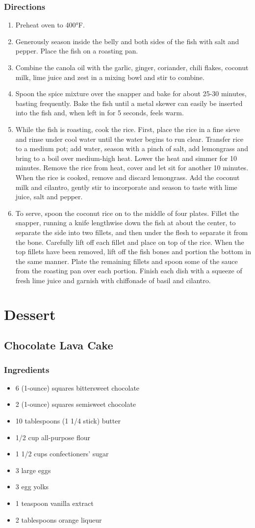 \documentclass[oneside,11pt]{book}
\newcommand{\Ingredients}[1]{
    \subsection*{Ingredients}
    \begin{itemize} 
      #1 
    \end{itemize}
}
\newcommand{\Directions}[1]{
    \subsection*{Directions}
    \begin{enumerate} 
      #1 
    \end{enumerate}
}
\newcommand{\recipe}[1]{
    \section*{ \hspace{-12pt} #1 }
    \addcontentsline{toc}{section}{ \hspace{-6pt} #1 }
}
\begin{document}
        \Directions{
            \item Preheat oven to 400°F.
            \item Generously season inside the belly and both sides of the fish with salt and pepper. 
                Place the fish on a roasting pan.
            \item Combine the canola oil with the garlic, ginger, coriander, chili flakes, coconut milk, lime juice and zest in a mixing bowl and stir to combine.
            \item Spoon the spice mixture over the snapper and bake for about 25-30 minutes, basting frequently. 
                Bake the fish until a metal skewer can easily be inserted into the fish and, when left in for 5 seconds, feels warm.
            \item While the fish is roasting, cook the rice. 
                First, place the rice in a fine sieve and rinse under cool water until the water begins to run clear. 
                Transfer rice to a medium pot; add water, season with a pinch of salt, add lemongrass and bring to a boil over medium-high heat. 
                Lower the heat and simmer for 10 minutes. Remove the rice from heat, cover and let sit for another 10 minutes. 
                When the rice is cooked, remove and discard lemongrass. 
                Add the coconut milk and cilantro, gently stir to incorporate and season to taste with lime juice, salt and pepper.
            \item To serve, spoon the coconut rice on to the middle of four plates. 
                Fillet the snapper, running a knife lengthwise down the fish at about the center, to separate the side into two fillets, and then under the flesh to separate it from the bone. 
                Carefully lift off each fillet and place on top of the rice. 
                When the top fillets have been removed, lift off the fish bones and portion the bottom in the same manner. 
                Plate the remaining fillets and spoon some of the sauce from the roasting pan over each portion. 
                Finish each dish with a squeeze of fresh lime juice and garnish with chiffonade of basil and cilantro.
        }
        
\chapter{Dessert}
    \recipe{Chocolate Lava Cake}
        \Ingredients{
            \item 6 (1-ounce) squares bittersweet chocolate
            \item 2 (1-ounce) squares semisweet chocolate
            \item 10 tablespoons (1 1/4 stick) butter
            \item 1/2 cup all-purpose flour
            \item 1 1/2 cups confectioners' sugar
            \item 3 large eggs
            \item 3 egg yolks
            \item 1 teaspoon vanilla extract
            \item 2 tablespoons orange liqueur
        }
    
\end{document}
